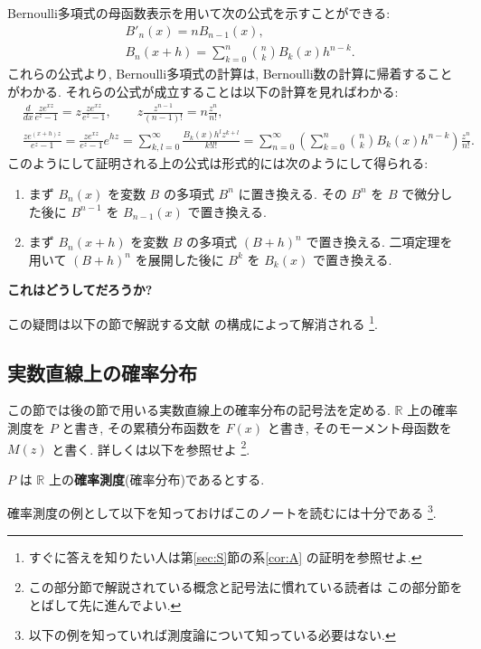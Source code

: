 \documentclass[12pt,twoside]{jarticle}
\newcommand\BF{\bfseries}
\newcommand\R{{\mathbb R}} %
\newcommand\PM{P} %
\theoremstyle{jplain}
\theoremstyle{jplain}
\theoremstyle{jplain}
\numberwithin{theorem}{section}
\numberwithin{equation}{section}
\numberwithin{figure}{section}
\numberwithin{table}{section}
\newcommand\secref[1]{第\ref{#1}節}
\newcommand\corref[1]{系\ref{#1}}
\begin{document}
Bernoulli多項式の母函数表示を用いて次の公式を示すことができる:
\begin{align*}
& B'_n(x) = n B_{n-1}(x), \\
& B_n(x+h) = \sum_{k=0}^n \binom{n}{k} B_k(x)h^{n-k}.
\end{align*}
これらの公式より, Bernoulli多項式の計算は,
Bernoulli数の計算に帰着することがわかる.
それらの公式が成立することは以下の計算を見ればわかる:
\begin{align*}
  &
  \frac{d}{dx}\frac{ze^{xz}}{e^z-1}=z\frac{ze^{xz}}{e^z-1},
  \qquad
  z\frac{z^{n-1}}{(n-1)!} = n\frac{z^n}{n!},
  \\ &
  \frac{ze^{(x+h)z}}{e^z-1}=\frac{ze^{xz}}{e^z-1}e^{hz}
  =\sum_{k,l=0}^\infty \frac{B_k(x)h^l z^{k+l}}{k!l!}
  =\sum_{n=0}^\infty
  \left(\sum_{k=0}^n\binom{n}{k}B_k(x)h^{n-k}\right)
  \frac{z^n}{n!}.
\end{align*}
このようにして証明される上の公式は形式的には次のようにして得られる:
\begin{enumerate}
  \item まず $B_n(x)$ を変数 $B$ の多項式 $B^n$ に置き換える.
  その $B^n$ を $B$ で微分した後に $B^{n-1}$ を $B_{n-1}(x)$ で置き換える.
  \item まず $B_n(x+h)$ を変数 $B$ の多項式 $(B+h)^n$ で置き換える.
  二項定理を用いて $(B+h)^n$ を展開した後に $B^k$ を $B_k(x)$ で置き換える.
\end{enumerate}

{\BF これはどうしてだろうか?}

この疑問は以下の節で解説する文献 \cite{BCM2009} の構成によって解消される%
\footnote{すぐに答えを知りたい人は\secref{sec:S}の\corref{cor:A}
の証明を参照せよ.}.


\subsection{実数直線上の確率分布}
\label{sec:mu}

この節では後の節で用いる実数直線上の確率分布の記号法を定める.
$\R$ 上の確率測度を $\PM$ と書き, その累積分布函数を $F(x)$ と書き,
そのモーメント母函数を $M(z)$ と書く.
詳しくは以下を参照せよ%
\footnote{この部分節で解説されている概念と記号法に慣れている読者は
この部分節をとばして先に進んでよい.}.

$\PM$ は $\R$ 上の{\BF 確率測度}(確率分布)であるとする.

確率測度の例として以下を知っておけばこのノートを読むには十分である%
\footnote{以下の例を知っていれば測度論について知っている必要はない.}.
\end{document}
